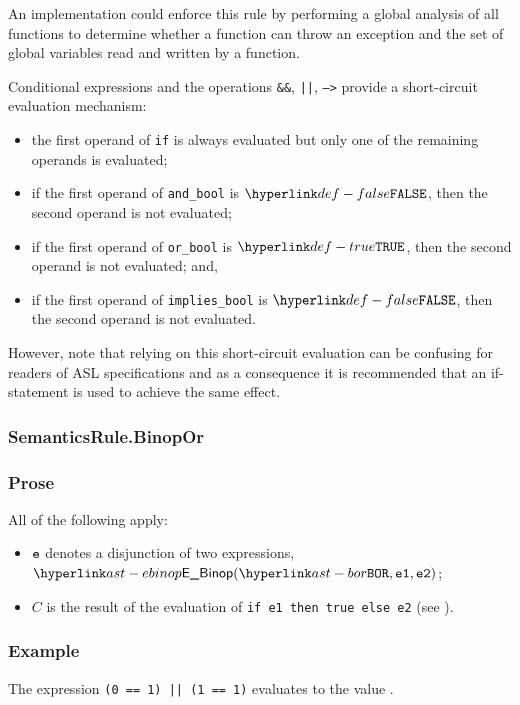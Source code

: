An implementation could enforce this rule by performing a global analysis of
all functions to determine whether a function can throw an exception and the
set of global variables read and written by a function.

Conditional expressions and the operations \texttt{\&\&}, \texttt{||},
\texttt{-->} provide a short-circuit evaluation mechanism:

\begin{itemize}
\item the first operand of \texttt{if} is always evaluated but only one of the
remaining operands is evaluated;
\item if the first operand of \texttt{and\_bool} is $\False$, then the second operand is not evaluated;
\item if the first operand of \texttt{or\_bool} is $\True$, then the second operand is not evaluated; and,
\item if the first operand of \texttt{implies\_bool} is $\False$, then the
second operand is not evaluated.
\end{itemize}

However, note that relying on this short-circuit evaluation can be confusing
for readers of ASL specifications and as a consequence it is recommended that
an if-statement is used to achieve the same effect.

\subsubsection{SemanticsRule.BinopOr \label{sec:SemanticsRule.BinopOr}}
\subsubsection{Prose}
All of the following apply:
\begin{itemize}
\item $\texttt{e}$ denotes a disjunction of two expressions, $\EBinop(\BOR, \veone, \vetwo)$;
\item $C$ is the result of the evaluation of
      \texttt{if e1 then true else e2} (see ).
\end{itemize}

\subsubsection{Example}
The expression \texttt{(0 == 1) || (1 == 1)} evaluates to the value \True.

